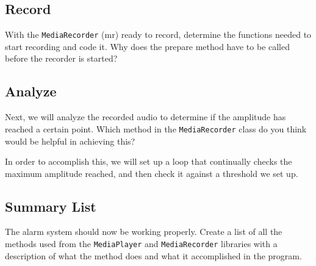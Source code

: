 \subsection{Record}
With the \verb=MediaRecorder= (mr) ready to record, determine the functions needed to start recording and code it. Why does the prepare method have to be called before the recorder is started?

\subsection{Analyze}
Next, we will analyze the recorded audio to determine if the amplitude has reached a certain point. Which method in the \verb=MediaRecorder= class do you think would be helpful in achieving this?

In order to accomplish this, we will set up a loop that continually checks the maximum amplitude reached, and then check it against a threshold we set up.

\subsection{Summary List}
The alarm system should now be working properly. Create a list of all the methods used from the \verb=MediaPlayer= and \verb=MediaRecorder= libraries with a description of what the method does and what it accomplished in the program.